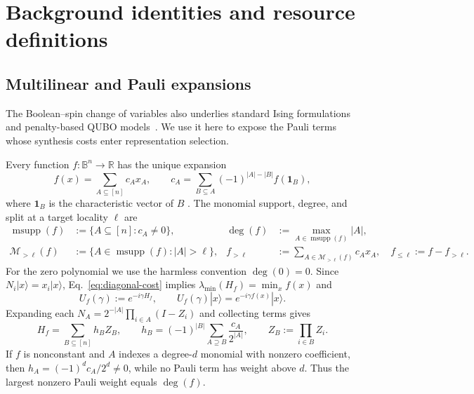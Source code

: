 \documentclass[a4paper,onecolumn,11pt,unpublished]{quantumarticle}
\theoremstyle{remark}
\begin{document}
\clearpage
\appendix
\section{Background identities and resource definitions}
\label{app:background-details}

\subsection{Multilinear and Pauli expansions}
The Boolean--spin change of variables also underlies standard Ising
formulations~\cite{Lucas2014} and penalty-based QUBO
models~\cite{Glover2018}. We use it here to expose the Pauli terms
whose synthesis costs enter representation selection.

Every function $f:\mathbb B^n\to\mathbb R$ has the unique expansion
\begin{equation}
  f(x)=\sum_{A\subseteq[n]}c_Ax_A,
  \qquad
  c_A=\sum_{B\subseteq A}(-1)^{|A|-|B|}f(\mathbf1_B),
  \label{eq:canonical-pb}
\end{equation}
where $\mathbf1_B$ is the characteristic vector of $B$
\cite{BorosHammer2002,Hadfield2021}.
The monomial support, degree, and split at a target locality $\ell$ are
\begin{align}
  \operatorname{msupp}(f)&:=\{A\subseteq[n]:c_A\ne0\},
  &\deg(f)&:=\max_{A\in\operatorname{msupp}(f)}|A|,
  \label{eq:support-degree}\\
  \mathcal M_{>\ell}(f)&:=\{A\in\operatorname{msupp}(f):|A|>\ell\},
  &f_{>\ell}&:=\sum_{A\in\mathcal M_{>\ell}(f)}c_Ax_A,
  \quad f_{\leq\ell}:=f-f_{>\ell}.
  \label{eq:target-split}
\end{align}
For the zero polynomial we use the harmless convention $\deg(0)=0$.
Since $N_i|x\rangle=x_i|x\rangle$, Eq.~\eqref{eq:diagonal-cost}
implies $\lambda_{\min}(H_f)=\min_x f(x)$ and
\begin{equation}
  U_f(\gamma):=e^{-i\gamma H_f},
  \qquad U_f(\gamma)|x\rangle=e^{-i\gamma f(x)}|x\rangle.
  \label{eq:phase-separator}
\end{equation}
Expanding each $N_A=2^{-|A|}\prod_{i\in A}(I-Z_i)$ and collecting terms
gives~\cite{Hadfield2021}
\begin{equation}
  H_f=\sum_{B\subseteq[n]}h_BZ_B,
  \qquad
  h_B=(-1)^{|B|}\sum_{A\supseteq B}\frac{c_A}{2^{|A|}},
  \qquad Z_B:=\prod_{i\in B}Z_i.
  \label{eq:pauli-coefficients}
\end{equation}
If $f$ is nonconstant and $A$ indexes a degree-$d$ monomial with nonzero
coefficient, then $h_A=(-1)^dc_A/2^d\ne0$, while no Pauli term has
weight above $d$. Thus the largest nonzero Pauli weight equals $\deg(f)$.
\end{document}
